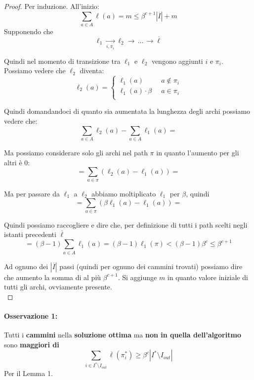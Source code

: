 \documentclass[11pt]{article}
\begin{document}
	\begin{proof}
		Per induzione. All'inizio: 
		$$ \sum_{a \in A} \ell (a) = m  \leq \beta^{c+1} |\overline{I}| + m$$
		Supponendo che 
		$$ \ell_1 \xrightarrow[i, \pi_i]{} \ell_2 \rightarrow \, ... \, \rightarrow \overline{\ell}$$
		
		Quindi nel momento di transizione tra $\ell_1$ e $\ell_2$ vengono aggiunti $i$ e $\pi_i$. \\
		Possiamo vedere che $\ell_2$ diventa:
		$$
		\ell_2 (a) = \begin{cases}
			\ell_1 (a) & a \notin \pi_i \\
			\ell_1 (a) \cdot \beta \;\; & a \in \pi_i \\
		\end{cases}
		$$
		
		Quindi domandandoci di quanto sia aumentata la lunghezza degli archi possiamo vedere che:
		$$ \sum_{a \in A} \ell_2 (a) - \sum_{a \in A} \ell_1 (a) = $$
		
		Ma possiamo considerare solo gli archi nel path $\pi$ in quanto l'aumento per gli altri è 0: 
		$$ = \sum_{a \in \pi} \left(\ell_2 (a) - \ell_1 (a)\right) =$$
		
		Ma per passare da $\ell_1$ a $\ell_2$ abbiamo moltiplicato $\ell_1$ per $\beta$, quindi
		$$ = \sum_{a \in \pi} \left( \beta \ell_1 (a) - \ell_1 (a) \right) = $$
		
		Quindi possiamo raccogliere e dire che, per definizione di tutti i path scelti negli istanti precedenti $\overline{\ell}$
		$$ = (\beta -1) \sum_{a \in A} \ell_1 (a) = (\beta -1) \ell_1 (\pi) < (\beta -1) \beta^c \leq \beta^{c+1} $$
	
		Ad ognuno dei $|\overline{I}|$ passi (quindi per ognuno dei cammini trovati) possiamo dire che aumento la somma di al più $\beta^{c+1}$. Si aggiunge $m$ in quanto valore iniziale di tutti gli archi, ovviamente presente.\\
	\end{proof}
	
	\paragraph{Osservazione 1:} Tutti i \textbf{cammini} nella \textbf{soluzione ottima} ma \textbf{non in quella dell'algoritmo} sono \textbf{maggiori di}
	$$ \sum_{i \in I^\ast \setminus I_{out}} \overline{\ell} (\pi_i^\ast) \geq \beta^c |I^\ast \setminus I_{out}|$$
	Per il Lemma 1.\\
	
\end{document}
